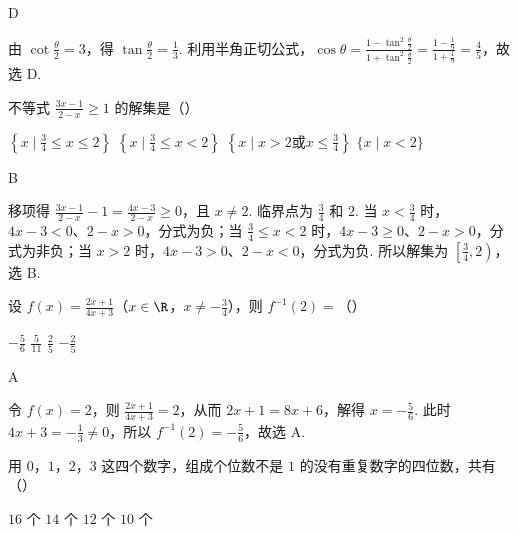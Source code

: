 \begin{answer}D\end{answer}

\begin{solution}
由 \(\cot\frac\theta2=3\)，得 \(\tan\frac\theta2=\frac13\). 利用半角正切公式，\(\cos\theta=\frac{1-\tan^{2}\frac\theta2}{1+\tan^{2}\frac\theta2}=\frac{1-\frac19}{1+\frac19}=\frac45\)，故选 D.
\end{solution}

\begin{problem}
不等式 \(\displaystyle\frac{3x-1}{2-x}\geqslant1\) 的解集是（\quad）

\choices
{\(\left\{x\mid\frac34\leqslant x\leqslant2\right\}\)}
{\(\left\{x\mid\frac34\leqslant x<2\right\}\)}
{\(\left\{x\mid x>2\text{或}x\leqslant\frac34\right\}\)}
{\(\{x\mid x<2\}\)}
\end{problem}

\begin{answer}B\end{answer}

\begin{solution}
移项得 \(\frac{3x-1}{2-x}-1=\frac{4x-3}{2-x}\geqslant0\)，且 \(x\neq2\). 临界点为 \(\frac34\) 和 \(2\). 当 \(x<\frac34\) 时，\(4x-3<0\)、\(2-x>0\)，分式为负；当 \(\frac34\leqslant x<2\) 时，\(4x-3\geqslant0\)、\(2-x>0\)，分式为非负；当 \(x>2\) 时，\(4x-3>0\)、\(2-x<0\)，分式为负. 所以解集为 \(\left[\frac34,2\right)\)，选 B.
\end{solution}

\begin{problem}
设 \(f(x)=\frac{2x+1}{4x+3}\)（\(x\in\R\)，\(x\neq-\frac34\)），则 \(f^{-1}(2)=\)（\quad）

\choices
{\(-\frac56\)}
{\(\frac5{11}\)}
{\(\frac25\)}
{\(-\frac25\)}
\end{problem}

\begin{answer}A\end{answer}

\begin{solution}
令 \(f(x)=2\)，则 \(\frac{2x+1}{4x+3}=2\)，从而 \(2x+1=8x+6\)，解得 \(x=-\frac56\). 此时 \(4x+3=-\frac13\neq0\)，所以 \(f^{-1}(2)=-\frac56\)，故选 A.
\end{solution}

\begin{problem}
用 \(0\)，\(1\)，\(2\)，\(3\) 这四个数字，组成个位数不是 \(1\) 的没有重复数字的四位数，共有（\quad）

\choices
{\(16\) 个}
{\(14\) 个}
{\(12\) 个}
{\(10\) 个}
\end{problem}

